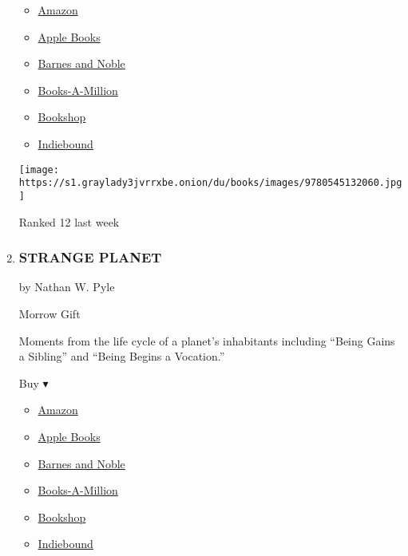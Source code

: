 \begin{enumerate}
  \begin{itemize}
  \tightlist
  \item
    \href{http://www.amazon.com/Smile-Raina-Telgemeier/dp/0545132061?tag=NYTBS-20}{Amazon}
  \item
    \href{https://du-gae-books-dot-nyt-du-prd.appspot.com/buy?title=SMILE\&author=Raina+Telgemeier}{Apple
    Books}
  \item
    \href{https://www.anrdoezrs.net/click-7990613-11819508?url=https\%3A\%2F\%2Fwww.barnesandnoble.com\%2Fw\%2F\%3Fean\%3D9780545132060}{Barnes
    and Noble}
  \item
    \href{https://www.anrdoezrs.net/click-7990613-35140?url=https\%3A\%2F\%2Fwww.booksamillion.com\%2Fp\%2FSMILE\%2FRaina\%2BTelgemeier\%2F9780545132060}{Books-A-Million}
  \item
    \href{https://bookshop.org/a/3546/9780545132060}{Bookshop}
  \item
    \href{https://www.indiebound.org/book/9780545132060?aff=NYT}{Indiebound}
  \end{itemize}

  \texttt{[image: https://s1.graylady3jvrrxbe.onion/du/books/images/9780545132060.jpg]}

  Ranked 12 last week
\item
  \hypertarget{strange-planet}{%
  \subsubsection{STRANGE PLANET}\label{strange-planet}}

  by Nathan W. Pyle

  Morrow Gift

  Moments from the life cycle of a planet's inhabitants including
  ``Being Gains a Sibling'' and ``Being Begins a Vocation.''

  Buy ▾

  \begin{itemize}
  \tightlist
  \item
    \href{https://www.amazon.com/Strange-Planet-Nathan-W-Pyle/dp/0062970704?tag=NYTBS-20}{Amazon}
  \item
    \href{https://du-gae-books-dot-nyt-du-prd.appspot.com/buy?title=STRANGE+PLANET\&author=Nathan+W+Pyle}{Apple
    Books}
  \item
    \href{https://www.anrdoezrs.net/click-7990613-11819508?url=https\%3A\%2F\%2Fwww.barnesandnoble.com\%2Fw\%2F\%3Fean\%3D9780062970701}{Barnes
    and Noble}
  \item
    \href{https://www.anrdoezrs.net/click-7990613-35140?url=https\%3A\%2F\%2Fwww.booksamillion.com\%2Fp\%2FSTRANGE\%2BPLANET\%2FNathan\%2BW\%2BPyle\%2F9780062970701}{Books-A-Million}
  \item
    \href{https://bookshop.org/a/3546/9780062970701}{Bookshop}
  \item
    \href{https://www.indiebound.org/book/9780062970701?aff=NYT}{Indiebound}
  \end{itemize}


\end{enumerate}
